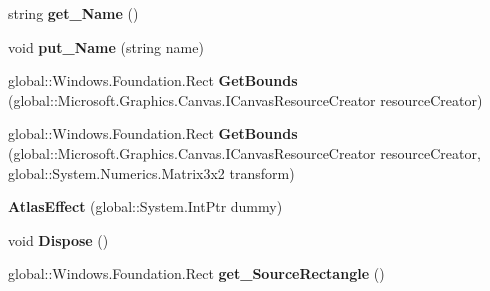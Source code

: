 \begin{DoxyCompactItemize}
\item 
\mbox{\label{class_microsoft_1_1_graphics_1_1_canvas_1_1_effects_1_1_atlas_effect_a902afae189388ba6ee558b945f702ce9}} 
string {\bfseries get\+\_\+\+Name} ()
\item 
\mbox{\label{class_microsoft_1_1_graphics_1_1_canvas_1_1_effects_1_1_atlas_effect_ac8e055fa19cdf099c03e817518eb3a22}} 
void {\bfseries put\+\_\+\+Name} (string name)
\item 
\mbox{\label{class_microsoft_1_1_graphics_1_1_canvas_1_1_effects_1_1_atlas_effect_aa4b944d340dc47c1e8de93692bf057fb}} 
global\+::\+Windows.\+Foundation.\+Rect {\bfseries Get\+Bounds} (global\+::\+Microsoft.\+Graphics.\+Canvas.\+I\+Canvas\+Resource\+Creator resource\+Creator)
\item 
\mbox{\label{class_microsoft_1_1_graphics_1_1_canvas_1_1_effects_1_1_atlas_effect_af407ba20dad039a6d8dbb231b3b3718d}} 
global\+::\+Windows.\+Foundation.\+Rect {\bfseries Get\+Bounds} (global\+::\+Microsoft.\+Graphics.\+Canvas.\+I\+Canvas\+Resource\+Creator resource\+Creator, global\+::\+System.\+Numerics.\+Matrix3x2 transform)
\item 
\mbox{\label{class_microsoft_1_1_graphics_1_1_canvas_1_1_effects_1_1_atlas_effect_a9224bd02ca7d3b31765c8f85e77066bd}} 
{\bfseries Atlas\+Effect} (global\+::\+System.\+Int\+Ptr dummy)
\item 
\mbox{\label{class_microsoft_1_1_graphics_1_1_canvas_1_1_effects_1_1_atlas_effect_a565fbf00024f2bc49eda0142d8328107}} 
void {\bfseries Dispose} ()
\item 
\mbox{\label{class_microsoft_1_1_graphics_1_1_canvas_1_1_effects_1_1_atlas_effect_aef2eff3d4b0a6e08db65a1ec2b79dd7c}} 
global\+::\+Windows.\+Foundation.\+Rect {\bfseries get\+\_\+\+Source\+Rectangle} ()

\end{DoxyCompactItemize}
